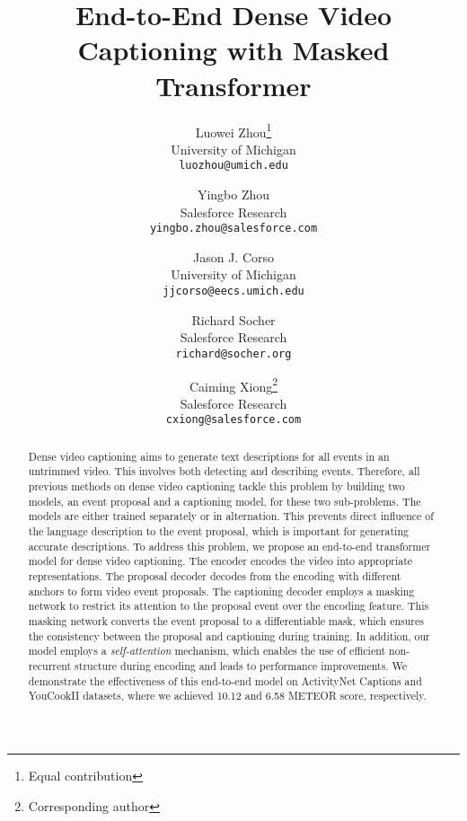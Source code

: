 \documentclass[10pt,twocolumn,letterpaper]{article}
\newcommand*\samethanks[1][\value{footnote}]{\footnotemark[#1]}
\begin{document}
\title{End-to-End Dense Video Captioning with Masked Transformer}

\author{Luowei Zhou\thanks{Equal contribution}\\
University of Michigan\\
{\tt\small luozhou@umich.edu}
\and
Yingbo Zhou\samethanks{}\\
Salesforce Research\\
{\tt\small yingbo.zhou@salesforce.com}
\and
Jason J. Corso\\
University of Michigan\\
{\tt\small jjcorso@eecs.umich.edu}
\and
Richard Socher\\
Salesforce Research\\
{\tt\small richard@socher.org}
\and
Caiming Xiong\thanks{Corresponding author}\\
Salesforce Research\\
{\tt\small cxiong@salesforce.com}
}

\maketitle


\begin{abstract}
Dense video captioning aims to generate text descriptions for all events in an untrimmed video. This involves both detecting and describing events. Therefore, all previous methods on dense video captioning tackle this problem by building two models, \ie an event proposal and a captioning model, for these two sub-problems. The models are either trained separately or in alternation. This prevents direct influence of the language description to the event proposal, which is important for generating accurate descriptions. To address this problem, we propose an end-to-end transformer model for dense video captioning. The encoder encodes the video into appropriate representations. The proposal decoder decodes from the encoding with different anchors to form video event proposals. The captioning decoder employs a masking network to restrict its attention to the proposal event over the encoding feature. This masking network converts the event proposal to a differentiable mask, which ensures the consistency between the proposal and captioning during training. In addition, our model employs a \emph{self-attention} mechanism, which enables the use of efficient non-recurrent structure during encoding and leads to performance improvements. We demonstrate the effectiveness of this end-to-end model on ActivityNet Captions and YouCookII datasets, where we achieved 10.12 and 6.58 METEOR score, respectively.
\end{abstract}
\end{document}
